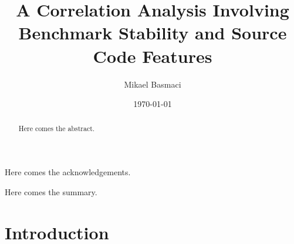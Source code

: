 \documentclass{seal_thesis}
\date{\today}
\title{A Correlation Analysis Involving Benchmark Stability and Source Code Features}
\author{Mikael Basmaci}
\begin{document}
\maketitle

\frontmatter

\begin{acknowledgements}
	Here comes the acknowledgements.
\end{acknowledgements}

\begin{abstract}
	Here comes the abstract.
\end{abstract}

\begin{zusammenfassung}
	Here comes the summary.
\end{zusammenfassung}

\tableofcontents
\listoffigures
\listoftables
\lstlistoflistings

\mainmatter

\chapter{Introduction}
\end{document}

